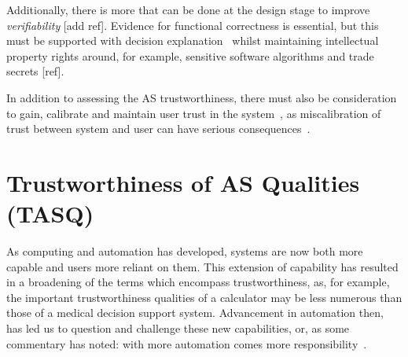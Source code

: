 Additionally, there is more that can be done at the design stage to improve \emph{verifiability} [add ref]. Evidence for functional correctness is essential, but this must be supported with decision explanation~\cite{koopman2018toward} whilst maintaining intellectual property rights around, for example, sensitive software algorithms and trade secrets [ref]. 

In addition to assessing the AS trustworthiness, there must also be consideration to gain, calibrate and maintain user trust in the system~\cite{kok2020trust, Chiou2021}, as miscalibration of trust between system and user can have serious consequences~\cite{kok2020trust}. 





\section{Trustworthiness of AS Qualities (TASQ)}\label{sec:tasq}

As computing and automation has developed, systems are now both more capable and users more reliant on them. This extension of capability has resulted in a broadening of the terms which encompass trustworthiness, as, for example, the important trustworthiness qualities of a calculator may be less numerous than those of a medical decision support system. Advancement in automation then, has led us to question and challenge these new capabilities, or, as some commentary has noted: with more automation comes more responsibility~\cite{Yazdanpanah2021}. 

